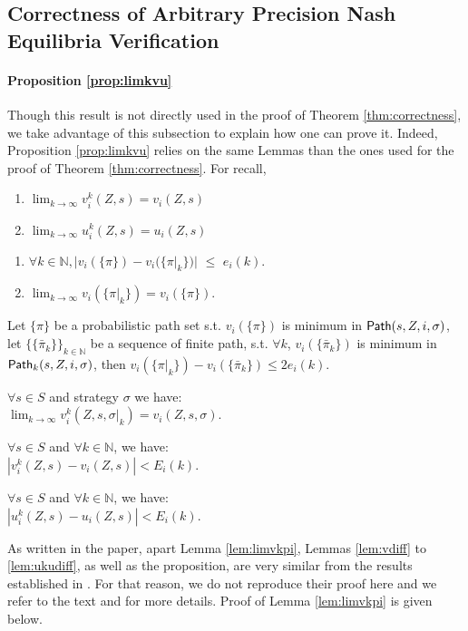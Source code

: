 \subsection{Correctness of Arbitrary Precision Nash Equilibria Verification\cite{MMS08}}
 
\paragraph{Proposition \ref{prop:limkvu}} Though this result is not directly used in the proof of Theorem \ref{thm:correctness}, we take advantage of this subsection to explain how one can prove it. Indeed, Proposition \ref{prop:limkvu} relies on the same Lemmas than the ones used for the proof of Theorem \ref{thm:correctness}.
For recall,
\begin{proposition}\label{prop:limkvu}
	\begin{enumerate}
		\item $\lim_{k\to\infty} v_i^{k}(Z,s)=v_i(Z,s)$
		\item $\lim_{k\to\infty} u_i^{k}(Z,s)=u_i(Z,s)$
	\end{enumerate}
\end{proposition}
\begin{lemma}\label{lem:limvkpi}
	\begin{enumerate}
		\item $\forall k\in \mathbb{N}, |v_i(\{\pi\})-v_i(\{\pi|_k\})|$ $\le$ $e_i(k)$.	
		\item $\lim_{k\to\infty}  v_i(\{\pi|_k\})=v_i(\{\pi\})$.
	\end{enumerate}
\end{lemma}
\begin{lemma}\label{lem:vdiff}
	Let $\{ \pi \}$ be a probabilistic path set s.t. $v_i(\{\pi\})$ is minimum in ${\sf Path}(s,Z,i,\sigma)$, let $\{\{\bar\pi_k \} \}_{k \in \mathbb{N}}$ be a sequence of finite path, s.t. $\forall k$, $v_i(\{\bar\pi_k   \})$ is minimum in ${\sf Path}_k(s,Z,i,\sigma)$, then $v_i(\{\pi|_k\})-v_i(\{\bar\pi_k\}) \le 2e_i(k)$.
\end{lemma}
\begin{lemma}\label{lem:limvkz}
	$\forall s\in S$ and strategy $\sigma$ we have:\\
	$\lim_{k\to\infty} v_i^{k}(Z,s,\sigma|_k) = v_i(Z,s,\sigma) $.
\end{lemma}
\begin{lemma}\label{lem:vkvdiff}
	$\forall  s\in S$ and $\forall k \in \mathbb{N}$, we have:\\
	$|v_i^{k}(Z,s)-v_i(Z,s)| < E_i(k)$.
\end{lemma}
\begin{lemma}\label{lem:ukudiff}
	$\forall s\in S$ and $\forall k \in \mathbb{N}$, we have: \\
	$|u_i^{k}(Z,s) - u_i(Z,s)| < E_i(k)$.
\end{lemma}
As written in the paper, apart Lemma \ref{lem:limvkpi}, Lemmas \ref{lem:vdiff} to \ref{lem:ukudiff}, as well as the proposition, are very similar from the results established in \cite{MariPhD}. For that reason, we do not reproduce their proof here and we refer to the text and \cite{MariPhD} for more details. Proof of Lemma \ref{lem:limvkpi} is given below.

